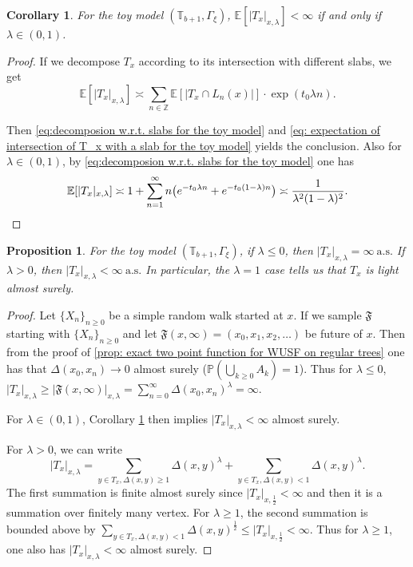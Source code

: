 \documentclass[12pt]{article}
\newtheorem{corollary}[theorem]{Corollary}
\newtheorem{proposition}[theorem]{Proposition}
\numberwithin{equation}{section}
\newcommand{\be}{\begin{equation}}
\newcommand{\ee}{\end{equation}}
\def\as {\mathrm{a.s.}}
\newcommand{\1}{\mathbf{1}}
\begin{document}
  \begin{corollary}\label{cor: expectation for WUSF on regular tree}
 	For  the toy model $(\mathbb{T}_{b+1},\Gamma_{\xi})$, $\mathbb{E}[|T_x|_{x,\lambda}]<\infty
 	$ if and only if $\lambda\in (0,1)$. 
 \end{corollary}
\begin{proof}
	If we decompose $T_x$ according to its intersection with different slabs, we get 
	\be\label{eq:decomposion w.r.t. slabs for the toy model}
	\mathbb{E}[|T_x|_{x,\lambda}]\asymp\sum_{n\in\mathbb{Z}}\mathbb{E}[|T_x\cap L_{n}(x)|]\cdot\exp(t_0\lambda n).
	\ee
	
	Then \eqref{eq:decomposion w.r.t. slabs for the toy model} and \eqref{eq: expectation of intersection of T_x with a slab for the toy model} yields the conclusion. Also for $\lambda\in(0,1)$, by \eqref{eq:decomposion w.r.t. slabs for the toy model} one has 
	\be\label{eq: asymptotic behavior of expected tilted volume when lambda is close to 0 or 1}
	\mathbb{E}[|T_x|_{x,\lambda}]\asymp 1+\sum_{n=1}^{\infty}n\big(e^{-t_0\lambda n}+e^{-t_0(1-\lambda)n}\big)\asymp\frac{1}{\lambda^2(1-\lambda)^2}.\qedhere
	\ee
\end{proof}
 
\begin{proposition}\label{prop: lightness of trees in the toy model}
	For  the toy model $(\mathbb{T}_{b+1},\Gamma_{\xi})$, if $\lambda\leq 0$, then $|T_x|_{x,\lambda}=\infty \ \as$
	If $\lambda>0$, then $|T_x|_{x,\lambda}<\infty\  \as$ 
	In particular, the $\lambda=1$ case tells us that $T_x$ is light almost surely.
\end{proposition} 
\begin{proof}
		Let $\{X_n\}_{n\geq0}$ be a simple random walk started at $x$. If we sample $\mathfrak{F}$ starting with $\{X_n\}_{n\geq0}$ and let $\mathfrak{F}(x,\infty)=(x_0,x_1,x_2,\ldots)$ be future of $x$. Then from the proof of \ref{prop: exact two point function for WUSF on regular trees} one has that $\Delta(x_0,x_n)\rightarrow0$ almost surely ($\mathbb{P}(\bigcup_{k\geq 0}A_k)=1$). 
	Thus for $\lambda\leq0 $, $|T_x|_{x,\lambda}\geq |\mathfrak{F}(x,\infty)|_{x,\lambda}=\sum_{n=0}^{\infty}\Delta(x_0,x_n)^\lambda=\infty$.
	
	For $\lambda\in(0,1)$, Corollary  \ref{cor: expectation for WUSF on regular tree}
	then implies $|T_x|_{x,\lambda}<\infty$ almost surely.
	
	For $\lambda>0$, we can write 
	\[
	|T_x|_{x,\lambda}=\sum_{y\in T_x,\Delta(x,y)\geq1}{\Delta(x,y)^\lambda}+\sum_{y\in T_x,\Delta(x,y)<1}{\Delta(x,y)^\lambda}.
	\]
	The first summation is finite almost surely since $|T_x|_{x,\frac{1}{2}}<\infty$ and then it is a summation over finitely many vertex. For $\lambda\geq1$, the second summation is bounded above by $\sum_{y\in T_x,\Delta(x,y)<1}{\Delta(x,y)^{\frac{1}{2}}}\leq |T_x|_{x,\frac{1}{2}}<\infty.$
	Thus for $\lambda\geq 1$,  one also has $|T_x|_{x,\lambda}<\infty$ almost surely.
\end{proof}
 
\end{document}
